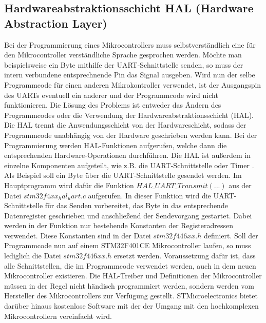 \subsection{Hardwareabstraktionsschicht HAL (Hardware Abstraction Layer)}
Bei der Programmierung eines Mikrocontrollers muss selbstverständlich eine für den Mikrocontroller verständliche Sprache gesprochen werden. Möchte man beispielsweise ein Byte mithilfe der UART-Schnittstelle senden, so muss der intern verbundene entsprechnende Pin das Signal ausgeben. Wird nun der selbe Programmcode für einen anderen Mikrokontroller verwendet, ist der Ausgangspin des UARTs eventuell ein anderer und der Programmcode wird nicht funktionieren. Die Lösung des Problems ist entweder das Ändern des Programmcodes oder die Verwendung der Hardwareabstraktionsschicht (HAL). Die HAL trennt die Anwendungsschicht von der Hardwareschicht, sodass der Programmcode unabhängig von der Hardware geschrieben werden kann. Bei der Programmierung werden HAL-Funktionen aufgerufen, welche dann die entsprechenden Hardware-Operationen durchführen. Die HAL ist außerdem in einzelne Komponenten aufgeteilt, wie z.B. die UART-Schnittstelle oder Timer \cite[S.77 ff.]{IoTSystems}. Als Beispiel soll ein Byte über die UART-Schnittstelle gesendet werden. Im Hauptprogramm wird dafür die Funktion $HAL\_UART\_Transmit(...)$ aus der Datei $stm32f4xx_hal_uart.c$ aufgerufen. In dieser Funktion wird die UART-Schnittstelle für das Senden vorbereitet, das Byte in das entsprechende Datenregister geschrieben und anschließend der Sendevorgang gestartet. Dabei werden in der Funktion nur bestehende Konstanten der Registeradressen verwendet. Diese Konstanten sind in der Datei $stm32f446xx.h$ definiert. Soll der Programmcode nun auf einem STM32F401CE Mikrocontroller laufen, so muss lediglich die Datei $stm32f446xx.h$ ersetzt werden. Voraussetzung dafür ist, dass alle Schnittstellen, die im Programmcode verwendet werden, auch in dem neuen Mikrocontroller existieren. Die HAL-Treiber und Definitionen der Mikrocontroller müssen in der Regel nicht händisch programmiert werden, sondern werden vom Hersteller des Mikrocontrollers zur Verfügung gestellt. STMicroelectronics bietet darüber hinaus kostenlose Software mit der der Umgang mit den hochkomplexen Mikrocontrollern vereinfacht wird.